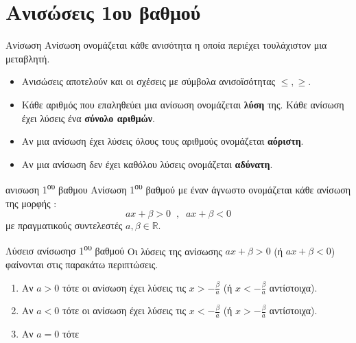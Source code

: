 \section{Ανισώσεις 1ου βαθμού}
\thewria
\begin{orismos}{Ανίσωση}
Ανίσωση ονομάζεται κάθε ανισότητα η οποία περιέχει τουλάχιστον μια μεταβλητή.
\end{orismos}
\begin{itemize}[itemsep=0mm]
\item Ανισώσεις αποτελούν και οι σχέσεις με σύμβολα ανισοϊσότητας $ \leq,\geq $.
\item Κάθε αριθμός που επαληθεύει μια ανίσωση ονομάζεται \textbf{λύση} της. Κάθε ανίσωση έχει λύσεις ένα \textbf{σύνολο αριθμών}.
\item Αν μια ανίσωση έχει λύσεις όλους τους αριθμούς ονομάζεται \textbf{αόριστη}.
\item Αν μια ανίσωση δεν έχει καθόλου λύσεις ονομάζεται \textbf{αδύνατη}.
\end{itemize}
\begin{orismos}{ανισωση 1\textsuperscript{\MakeLowercase{ου}} βαθμου}
Ανίσωση 1\textsuperscript{ου} βαθμού με έναν άγνωστο ονομάζεται κάθε ανίσωση της μορφής :
\[ ax+\beta>0\;\;,\;\;ax+\beta<0 \] με πραγματικούς συντελεστές $ a,\beta\in\mathbb{R} $.
\end{orismos}
\begin{thewrhma}{Λύσεισ ανίσωσησ 1\textsuperscript{\MakeLowercase{ου}} βαθμού}
Οι λύσεις της ανίσωσης $ ax+\beta>0 $ (ή $ ax+\beta<0 $) φαίνονται στις παρακάτω περιπτώσεις.
\begin{enumerate}
\item Αν $ a>0 $ τότε οι ανίσωση έχει λύσεις τις $ x>-\frac{\beta}{a} $ (ή $ x<-\frac{\beta}{a} $ αντίστοιχα).
\item Αν $ a<0 $ τότε οι ανίσωση έχει λύσεις τις $ x<-\frac{\beta}{a} $ (ή $ x>-\frac{\beta}{a} $ αντίστοιχα).
\item Αν $ a=0 $ τότε
\end{enumerate}
\end{thewrhma}
